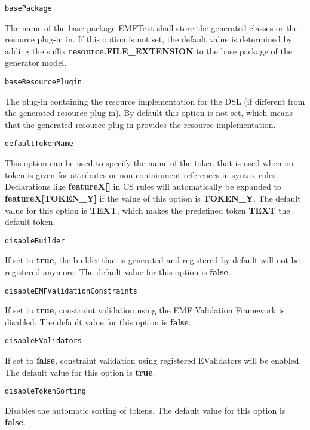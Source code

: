 \noindent\texttt{basePackage}
\begin{myindentpar}{1cm}
The name of the base package EMFText shall store the generated classes or the resource plug-in in. If this option is not set, the default value is determined by adding the suffix \textbf{resource.FILE\_EXTENSION} to the base package of the generator model.
\end{myindentpar}

\noindent\texttt{baseResourcePlugin}
\begin{myindentpar}{1cm}
The plug-in containing the resource implementation for the DSL (if different from the generated resource plug-in). By default this option is not set, which means that the generated resource plug-in provides the resource implementation.
\end{myindentpar}

\noindent\texttt{defaultTokenName}
\begin{myindentpar}{1cm}
This option can be used to specify the name of the token that is used when no token is given for attributes or non-containment references in syntax rules. Declarations like \textbf{featureX[]} in CS rules will automatically be expanded to \textbf{featureX[TOKEN\_Y]} if the value of this option is \textbf{TOKEN\_Y}. The default value for this option is \textbf{TEXT}, which makes the predefined token \textbf{TEXT} the default token.
\end{myindentpar}

\noindent\texttt{disableBuilder}
\begin{myindentpar}{1cm}
If set to \textbf{true}, the builder that is generated and registered by default will not be registered anymore. The default value for this option is \textbf{false}.
\end{myindentpar}

\noindent\texttt{disableEMFValidationConstraints}
\begin{myindentpar}{1cm}
If set to \textbf{true}, constraint validation using the EMF Validation Framework is disabled. The default value for this option is \textbf{false}.
\end{myindentpar}

\noindent\texttt{disableEValidators}
\begin{myindentpar}{1cm}
If set to \textbf{false}, constraint validation using registered EValidators will be enabled. The default value for this option is \textbf{true}.
\end{myindentpar}

\noindent\texttt{disableTokenSorting}
\begin{myindentpar}{1cm}
Disables the automatic sorting of tokens. The default value for this option is \textbf{false}.
\end{myindentpar}

